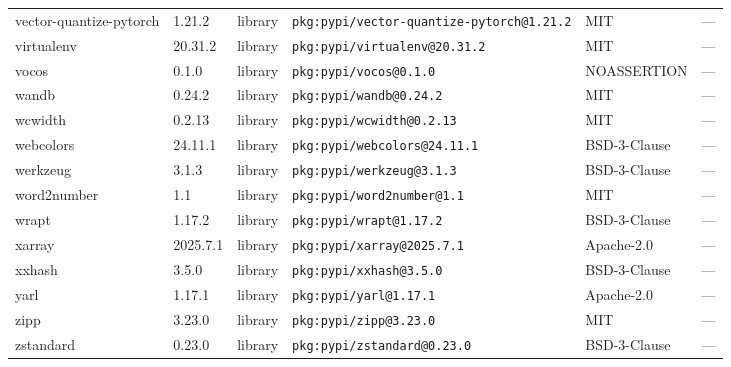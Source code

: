 \documentclass[11pt,a4paper]{article}
\begin{document}
\begin{longtable}{|p{4cm}|p{2cm}|p{1.6cm}|p{5cm}|p{1.5cm}|p{3.5cm}|}
\raggedright vector-quantize-pytorch & 1.21.2 & library & \small\texttt{pkg:pypi/vector-quantize-pytorch@1.21.2} & MIT & \small — \\
\raggedright virtualenv & 20.31.2 & library & \small\texttt{pkg:pypi/virtualenv@20.31.2} & MIT & \small — \\
\raggedright vocos & 0.1.0 & library & \small\texttt{pkg:pypi/vocos@0.1.0} & NOASSERTION & \small — \\
\raggedright wandb & 0.24.2 & library & \small\texttt{pkg:pypi/wandb@0.24.2} & MIT & \small — \\
\raggedright wcwidth & 0.2.13 & library & \small\texttt{pkg:pypi/wcwidth@0.2.13} & MIT & \small — \\
\raggedright webcolors & 24.11.1 & library & \small\texttt{pkg:pypi/webcolors@24.11.1} & BSD-3-Clause & \small — \\
\raggedright werkzeug & 3.1.3 & library & \small\texttt{pkg:pypi/werkzeug@3.1.3} & BSD-3-Clause & \small — \\
\raggedright word2number & 1.1 & library & \small\texttt{pkg:pypi/word2number@1.1} & MIT & \small — \\
\raggedright wrapt & 1.17.2 & library & \small\texttt{pkg:pypi/wrapt@1.17.2} & BSD-3-Clause & \small — \\
\raggedright xarray & 2025.7.1 & library & \small\texttt{pkg:pypi/xarray@2025.7.1} & Apache-2.0 & \small — \\
\raggedright xxhash & 3.5.0 & library & \small\texttt{pkg:pypi/xxhash@3.5.0} & BSD-3-Clause & \small — \\
\raggedright yarl & 1.17.1 & library & \small\texttt{pkg:pypi/yarl@1.17.1} & Apache-2.0 & \small — \\
\raggedright zipp & 3.23.0 & library & \small\texttt{pkg:pypi/zipp@3.23.0} & MIT & \small — \\
\raggedright zstandard & 0.23.0 & library & \small\texttt{pkg:pypi/zstandard@0.23.0} & BSD-3-Clause & \small — \\
\end{longtable}
\end{document}
